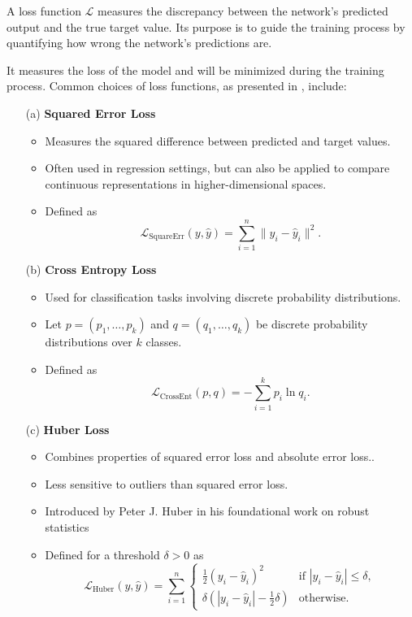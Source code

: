 A loss function \(\mathcal{L}\) measures the discrepancy between the network's predicted output and the true target value.  
Its purpose is to guide the training process by quantifying how wrong the network's predictions are.

It measures the  loss of the model and will be minimized during the training process.
Common choices of loss functions, as presented in \cite{zhou_machine_2021}, include:

\begin{enumerate}
    \item[(a)] \textbf{Squared Error Loss}
    \begin{itemize}
        \item Measures the squared difference between predicted and target values.
        \item Often used in regression settings, but can also be applied to compare continuous representations in higher-dimensional spaces.
        \item Defined as
        \[
        \mathcal{L}_{\operatorname{SquareErr}}(y, \hat{y}) = \sum_{i = 1}^{n} \| y_i - \hat{y}_i \|^2.
        \]
    \end{itemize}
    
    \item[(b)] \textbf{Cross Entropy Loss}
    \begin{itemize}
        \item Used for classification tasks involving discrete probability distributions.
        \item Let $p = (p_1, \dots, p_k)$ and $q = (q_1, \dots, q_k)$ be discrete probability distributions over $k$ classes.
        \item Defined as
        \[
        \mathcal{L}_{\operatorname{CrossEnt}}(p, q) = -\sum_{i=1}^{k} p_i \ln q_i.
        \]
    \end{itemize}
    
    \item[(c)] \textbf{Huber Loss}
    \begin{itemize}
        \item Combines properties of squared error loss and absolute error loss..
        \item Less sensitive to outliers than squared error loss.
        \item Introduced by Peter J. Huber in his foundational work on robust statistics \cite{gokcesu2021generalizedhuberlossrobust}
        \item Defined for a threshold $\delta > 0$ as
        \[
        \mathcal{L}_{\operatorname{Huber}}(y, \hat{y}) =
        \sum_{i=1}^{n}
        \begin{cases}
            \frac{1}{2} (y_i - \hat{y}_i)^2 & \text{if } |y_i - \hat{y}_i| \leq \delta, \\
            \delta \left( |y_i - \hat{y}_i| - \frac{1}{2} \delta \right) & \text{otherwise}.
        \end{cases}
        \]
    \end{itemize}
\end{enumerate}


